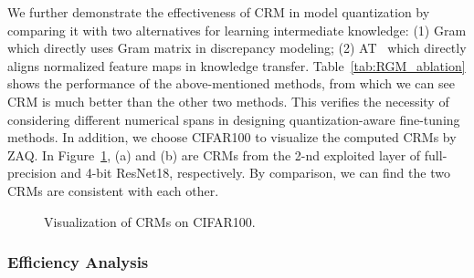 \documentclass[final]{cvpr}
\begin{document}
\begin{table}[ht]
  \centering
  \caption{Ablation study of CRM.}
  \label{tab:RGM_ablation}\end{table}

We further demonstrate the effectiveness of CRM in model quantization by comparing it with two alternatives for learning intermediate knowledge: (1) Gram which directly uses Gram matrix in discrepancy modeling; (2) AT~\cite{zagoruyko2016paying} which directly aligns normalized feature maps in knowledge transfer.
Table~\ref{tab:RGM_ablation} shows the performance of the above-mentioned methods, from which we can see CRM is much better than the other two methods.
This verifies the necessity of considering different numerical spans in designing quantization-aware fine-tuning methods.
In addition, we choose CIFAR100 to visualize the computed CRMs by ZAQ.
In Figure~\ref{fig:visual_RGM}, (a) and (b) are CRMs from the 2-nd exploited layer of full-precision and 4-bit ResNet18, respectively.
By comparison, we can find the two CRMs are consistent with each other.

\begin{figure}[b]
  \vspace{-2mm}
	\centering
	\caption{Visualization of CRMs on CIFAR100. }
  \label{fig:visual_RGM}
\end{figure}


\subsubsection{Efficiency Analysis}
\end{document}
